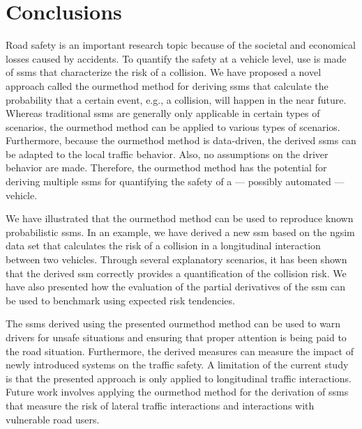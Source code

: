 \section{Conclusions}
\label{sec:conclusions}

Road safety is an important research topic because of the societal and economical losses caused by accidents.
To quantify the safety at a vehicle level, use is made of \acp{ssm} that characterize the risk of a collision. 
\cstarta We have proposed a novel approach called the \ac{ourmethod} method for deriving \acp{ssm} that calculate the probability that a certain event, e.g., a collision, will happen in the near future. 
Whereas traditional \acp{ssm} are generally only applicable in certain types of scenarios, the \ac{ourmethod} method can be applied to various types of scenarios.
Furthermore, because the \ac{ourmethod} method is data-driven, the derived \acp{ssm} can be adapted to the local traffic behavior. 
Also, no assumptions on the driver behavior are made.
Therefore, the \ac{ourmethod} method has the potential for deriving multiple \acp{ssm} for quantifying the safety of a --- possibly automated --- vehicle.

We have illustrated that the \ac{ourmethod} method can be used to reproduce known probabilistic \acp{ssm}.
In an example, we have derived a new \ac{ssm} based on the \ac{ngsim} data set that calculates the risk of a collision in a longitudinal interaction between two vehicles.
Through several explanatory scenarios, it has been shown that the derived \ac{ssm} correctly provides a quantification of the collision risk.
We have also presented how the evaluation of the partial derivatives of the \ac{ssm} can be used to benchmark  using expected risk tendencies. \cenda

The \acp{ssm} derived using the presented \ac{ourmethod} method can be used to warn drivers for unsafe situations and ensuring that proper attention is being paid to the road situation.
Furthermore, the derived measures can measure the impact of newly introduced systems on the traffic safety. 
A limitation of the current study is that the presented approach is only applied to longitudinal traffic interactions. 
\cstarta Future work involves applying the \ac{ourmethod} method for the derivation of \acp{ssm} that measure the risk of lateral traffic interactions and interactions with vulnerable road users. \cenda
